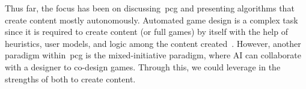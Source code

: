 


Thus far, the focus has been on discussing~\acrshort{pcg} and presenting algorithms that create content mostly autonomously. Automated game design is a complex task since it is required to create content (or full games) by itself with the help of heuristics, user models, and logic among the content created~\cite{Togelius2008-automaticGD,barros2018-DATAeinstein,Cook2016-Angelina1,Cook2020-automatedGDtutorial}. However, another paradigm within~\acrshort{pcg} is the mixed-initiative paradigm, where AI can collaborate with a designer to co-design games. Through this, we could leverage in the strengths of both to create content.



